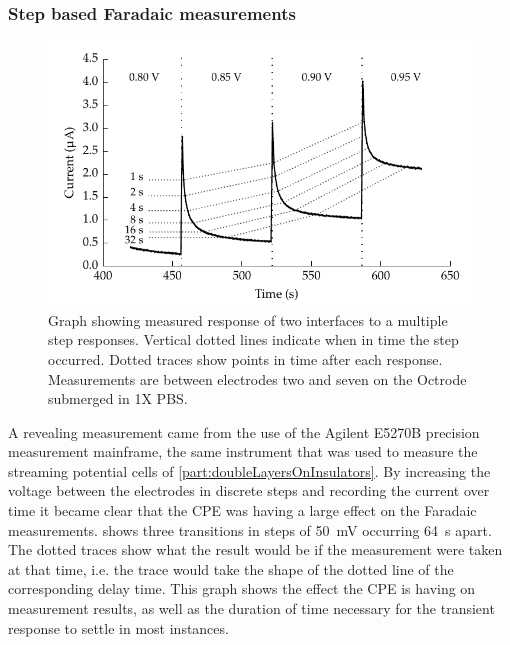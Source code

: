       \subsubsection{Step based Faradaic measurements}
        \begin{figure}
          \centering
          \includegraphics{content/pt2/08-InterfaceParameters/graphics/graph_64s_stirred}
          \caption{\label{fig:pt2-faradaic_decay}Graph showing measured response of two interfaces to a multiple step responses. Vertical dotted lines indicate when in time the step occurred. Dotted traces show points in time after each response. Measurements are between electrodes two and seven on the Octrode submerged in 1X PBS.}
        \end{figure}

        A revealing measurement came from the use of the Agilent E5270B precision measurement mainframe, the same instrument that was used to measure the streaming potential cells of \cref{part:doubleLayersOnInsulators}.
        By increasing the voltage between the electrodes in discrete steps and recording the current over time it became clear that the CPE was having a large effect on the Faradaic measurements.
         shows three transitions in steps of \SI{50}{\milli\volt} occurring \SI{64}{\second} apart.
        The dotted traces show what the result would be if the measurement were taken at that time, i.e. the trace would take the shape of the dotted line of the corresponding delay time.
        This graph shows the effect the CPE is having on measurement results, as well as the duration of time necessary for the transient response to settle in most instances.

